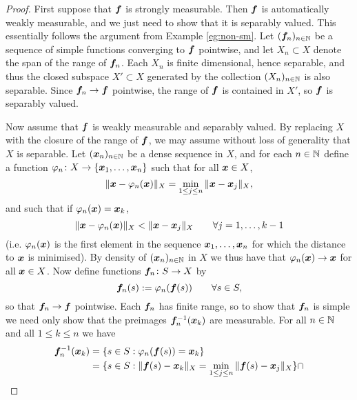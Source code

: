 \begin{proof}
  First suppose that $\bm{f}$ is strongly measurable.
  Then $\bm{f}$ is automatically weakly measurable, and we just need to show that it is separably valued.
  This essentially follows the argument from Example \ref{eg:non-sm}.
  Let $(\bm{f}_n)_{n \in \mathbb{N}}$ be a sequence of simple functions converging to $\bm{f}$ pointwise, and let $X_n \subset X$ denote the span of the range of $\bm{f}_n$.
  Each $X_n$ is finite dimensional, hence separable, and thus the closed subspace $X' \subset X$ generated by the collection $(X_n)_{n \in \mathbb{N}}$ is also separable.
  Since $\bm{f}_n \to \bm{f}$ pointwise, the range of $\bm{f}$ is contained in $X'$, so $\bm{f}$ is separably valued.

  Now assume that $\bm{f}$ is weakly measurable and separably valued.
  By replacing $X$ with the closure of the range of $\bm{f}$, we may assume without loss of generality that $X$ is separable.
  Let $(\bm{x}_n)_{n \in \mathbb{N}}$ be a dense sequence in $X$, and for each $n \in \mathbb{N}$ define a function $\varphi_n \colon X \rightarrow \{\bm{x}_1,\ldots,\bm{x}_n\}$ such that for all $\bm{x} \in X$,
  \begin{equation*}
    \|\bm{x} - \varphi_n(\bm{x})\|_X = \min_{1 \leq j \leq n} \|\bm{x} - \bm{x}_j\|_X,
  \end{equation*}
  and such that if $\varphi_{n}(\bm{x}) = \bm{x}_{k}$,
  \begin{equation*}
    \|\bm{x} - \varphi_n(\bm{x})\|_X <  \|\bm{x} - \bm{x}_j\|_X \qquad \forall j = 1,\ldots,k-1
  \end{equation*}
  (i.e. $\varphi_{n}(\bm{x})$ is the first element in the sequence $\bm{x}_{1}, \ldots, \bm{x}_{n}$ for which the distance to $\bm{x}$ is minimised).
  By density of $(\bm{x}_n)_{n \in \mathbb{N}}$ in $X$ we thus have that $\varphi_n(\bm{x}) \to \bm{x}$ for all $\bm{x} \in X$.
  Now define functions $\bm{f}_n \colon S \rightarrow X$ by
  \begin{equation*}
    \bm{f}_n(s) := \varphi_n(\bm{f}(s)) \qquad \forall s \in S,
  \end{equation*}
  so that $\bm{f}_n \to \bm{f}$ pointwise.
  Each $\bm{f}_n$ has finite range, so to show that $\bm{f}_n$ is simple we need only show that the preimages $\bm{f}_n^{-1}(\bm{x}_k)$ are measurable.
  For all $n \in \mathbb{N}$ and all $1 \leq k \leq n$ we have
  \begin{equation*}
    \begin{aligned}
    \mb{f}_n^{-1}(\mb{x}_k)
    &= \{s \in S : \phi_n(\mb{f}(s)) = \mb{x}_k \} \\
    &= \{s \in S : \|\mb{f}(s) - \mb{x}_k\|_X = \min_{1 \leq j \leq n} \|\mb{f}(s) - \mb{x}_j\|_X \} \cap \\

\end{aligned}
\end{equation*}
\end{proof}
